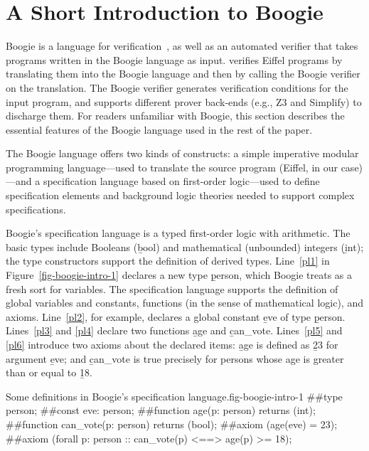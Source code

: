 \section{A Short Introduction to Boogie} \label{boogie-intro}


Boogie is a language for verification~\cite{LEINO08}, as well as an
automated verifier that takes programs written in the Boogie language
as input.  \AutoProof verifies Eiffel programs by translating them
into the Boogie language and then by calling the Boogie verifier on
the translation. The Boogie verifier generates verification conditions
for the input program, and supports different prover back-ends (e.g.,
Z3 and Simplify) to discharge them.  For readers unfamiliar with
Boogie, this section describes the essential features of the Boogie
language used in the rest of the paper.

The Boogie language offers two kinds of constructs: a simple
imperative modular programming language---used to translate the source
program (Eiffel, in our case)---and a specification language based on
first-order logic---used to define specification elements
and background logic theories needed to support complex
specifications.

Boogie's specification language is a typed first-order logic with arithmetic.
The basic types include Booleans (\b{bool}) and mathematical (unbounded) integers (\b{int}); the type constructors support the definition of derived types.
Line~\ref{pl1} in Figure~\ref{fig-boogie-intro-1} declares a new type \b{person}, which Boogie treats as a fresh sort for variables.
The specification language supports the definition of global variables and constants, functions (in the sense of mathematical logic), and axioms.
Line~\ref{pl2}, for example, declares a global constant \b{eve} of type \b{person}.
Lines~\ref{pl3} and \ref{pl4} declare two functions \b{age} and \b{can_vote}.
Lines~\ref{pl5} and \ref{pl6} introduce two axioms about the declared items: \b{age} is defined as \b{23} for argument \b{eve}; and \b{can_vote} is true precisely for persons whose age is greater than or equal to \b{18}.


\begin{bfigure}[ht]{Some definitions in Boogie's specification language.}{fig-boogie-intro-1}
#\label{pl1}#type person;
#\label{pl2}#const eve: person;
#\label{pl3}#function age(p: person) returns (int);
#\label{pl4}#function can_vote(p: person) returns (bool);
#\label{pl5}#axiom (age(eve) = 23);
#\label{pl6}#axiom (forall p: person :: can_vote(p) <==> age(p) >= 18);
\end{bfigure}

